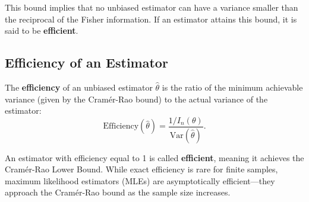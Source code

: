 \begin{center}
This bound implies that no unbiased estimator can have a variance smaller than the reciprocal of the Fisher information. If an estimator attains this bound, it is said to be \textbf{efficient}.

\subsection{Efficiency of an Estimator}

The \textbf{efficiency} of an unbiased estimator $\hat{\theta}$ is the ratio of the minimum achievable variance (given by the Cramér-Rao bound) to the actual variance of the estimator:
\[
\text{Efficiency}(\hat{\theta}) = \frac{1 / I_n(\theta)}{\mathrm{Var}(\hat{\theta})}.
\]

An estimator with efficiency equal to 1 is called \textbf{efficient}, meaning it achieves the Cramér-Rao Lower Bound. While exact efficiency is rare for finite samples, maximum likelihood estimators (MLEs) are asymptotically efficient—they approach the Cramér-Rao bound as the sample size increases.

\end{center}



